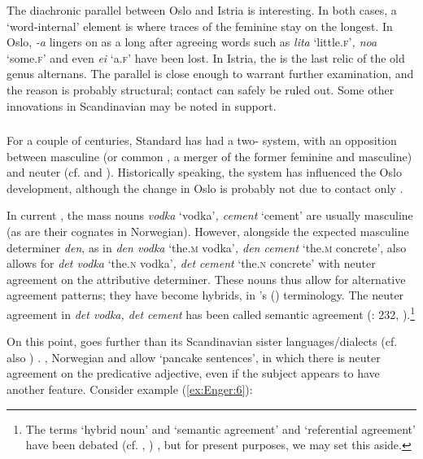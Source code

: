 \documentclass[output=paper]{langsci/langscibook}
\begin{document}
\begin{exe}
\begin{xlist}
\begin{xlist}
The diachronic parallel between Oslo and Istria is interesting. In both
cases, a `word-internal' element is where traces of the feminine stay on
the longest. In Oslo, \emph{-a} lingers on  as a  long after
agreeing words such as \emph{lita} `little.\textsc{f}'\emph{, noa} `some.\textsc{f}' and
even \emph{ei} `a.\textsc{f}' have been lost. In Istria, the  is the last
relic of the old genus alternans. The parallel is close enough to
warrant further examination, and the reason is probably structural;
contact can safely be ruled out. Some other innovations in Scandinavian
may be noted in support.

\subsubsection{}
\label{sec:enger:2.4.1}

For a couple of centuries, Standard  has had a two- system,
with an opposition between masculine (or common , a merger of the
former feminine and masculine) and neuter (cf.  and ).
Historically speaking, the  system has influenced the Oslo
development, although the change in Oslo is probably not due to contact
only %
\citep{Enger2004b}%
%
.

In current , the mass nouns \emph{vodka} `vodka'\emph{, cement}
`cement' are usually masculine (as are their cognates in Norwegian).
However, alongside the expected masculine determiner \emph{den}, as in
\emph{den vodka} `the.\textsc{m} vodka'\emph{, den cement} `the.\textsc{m} concrete',
 also allows for \emph{det vodka} `the.\textsc{n} vodka'\emph{, det cement}
`the.\textsc{n} concrete' with neuter agreement on the attributive determiner.
These nouns thus allow for alternative agreement patterns; they have
become hybrids, in %
\citeauthor{Corbett1991}'s (\citeyear{Corbett1991,Corbett2006}) %
%
terminology. The neuter
agreement in \emph{det vodka, det cement} has been called semantic
agreement %
(\citealt{Hansen11}: 232, \citealt{Enger13}%
%
).\footnote{The terms
  `hybrid noun' and `semantic agreement' and `referential agreement'
  have been debated %
(cf. \citealt{Dahl99a}, \citealt{Corbett2006})%
%
, but for present
  purposes, we may set this aside.}

On this point,  goes further than its Scandinavian sister
languages/dialects %
(cf. also \citealt{Josefsson14})%
%
. , Norwegian and
 allow `pancake sentences', in which there is neuter agreement on
the predicative adjective, even if the subject appears to have another
feature. Consider example (\ref{ex:Enger:6}):


\end{xlist}
\end{xlist}
\end{exe}
\end{document}
